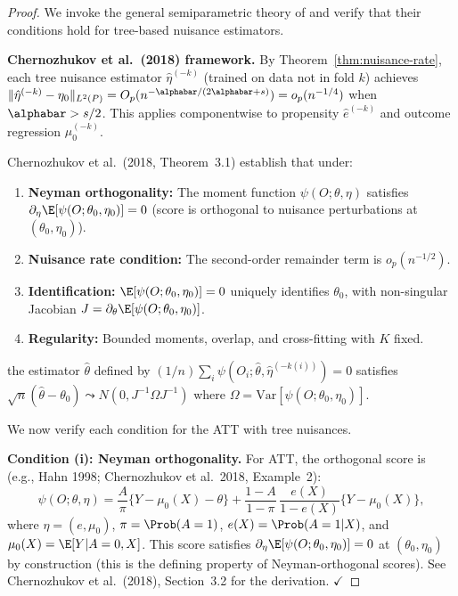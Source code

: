 \documentclass[12pt]{article}
\begin{document}
\begin{proof}
We invoke the general semiparametric theory of \citet{chernozhukov2018} and verify that their conditions hold for tree-based nuisance estimators.

\noindent\textbf{Chernozhukov et al.\ (2018) framework.}
By Theorem~\ref{thm:nuisance-rate}, each tree nuisance estimator $\hat\eta^{(-k)}$ (trained on data not in fold $k$) achieves $\|\hat\eta^{(-k)} - \eta_0\|_{L^2(P)} = O_p(n^{-\alphabar/(2\alphabar+s)}) = o_p(n^{-1/4})$ when $\alphabar > s/2$. This applies componentwise to propensity $\hat{e}^{(-k)}$ and outcome regression $\hat{\mu}_0^{(-k)}$.

Chernozhukov et al.\ (2018, Theorem~3.1) establish that under:
\begin{enumerate}[label=(\roman*)]
\item \textbf{Neyman orthogonality:} The moment function $\psi(O; \theta, \eta)$ satisfies $\partial_\eta \E[\psi(O; \theta_0, \eta_0)] = 0$ (score is orthogonal to nuisance perturbations at $(\theta_0, \eta_0)$).
\item \textbf{Nuisance rate condition:} The second-order remainder term is $o_p(n^{-1/2})$.
\item \textbf{Identification:} $\E[\psi(O; \theta_0, \eta_0)] = 0$ uniquely identifies $\theta_0$, with non-singular Jacobian $J = \partial_\theta \E[\psi(O; \theta_0, \eta_0)]$.
\item \textbf{Regularity:} Bounded moments, overlap, and cross-fitting with $K$ fixed.
\end{enumerate}
the estimator $\hat\theta$ defined by $(1/n)\sum_i \psi(O_i; \hat\theta, \hat\eta^{(-k(i))}) = 0$ satisfies $\sqrt{n}(\hat\theta - \theta_0) \leadsto N(0, J^{-1} \Omega J^{-1})$ where $\Omega = \text{Var}[\psi(O; \theta_0, \eta_0)]$.

We now verify each condition for the ATT with tree nuisances.

\noindent\textbf{Condition (i): Neyman orthogonality.}
For ATT, the orthogonal score is (e.g., Hahn 1998; Chernozhukov et al.\ 2018, Example~2):
\[
\psi(O; \theta, \eta) = \frac{A}{\pi}\bigl\{ Y - \mu_0(X) - \theta \bigr\} + \frac{1-A}{1-\pi} \, \frac{e(X)}{1 - e(X)} \bigl\{ Y - \mu_0(X) \bigr\},
\]
where $\eta = (e, \mu_0)$, $\pi = \Prob(A=1)$, $e(X) = \Prob(A=1|X)$, and $\mu_0(X) = \E[Y|A=0,X]$. This score satisfies $\partial_\eta \E[\psi(O; \theta_0, \eta_0)] = 0$ at $(\theta_0, \eta_0)$ by construction (this is the defining property of Neyman-orthogonal scores). See Chernozhukov et al.\ (2018), Section~3.2 for the derivation. $\checkmark$


\end{proof}
\end{document}
